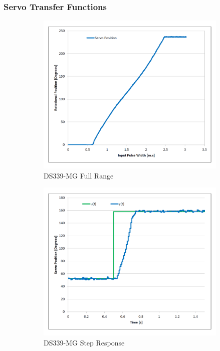 \subsubsection*{Servo Transfer Functions}
\begin{figure}[htbp]
\centering
\begin{subfigure}{0.49\textwidth}
\centering
\includegraphics[width=\textwidth]{graphs/servo-range}
\caption{DS339-MG Full Range}
\label{fig:servo-range}
\end{subfigure}
\begin{subfigure}{0.49\textwidth}
\centering
\includegraphics[width=\textwidth]{graphs/servo-step}
\caption{DS339-MG Step Response}
\label{fig:servo-step}
\end{subfigure}
\caption{}
\label{fig:servo-no-load}
\end{figure}
